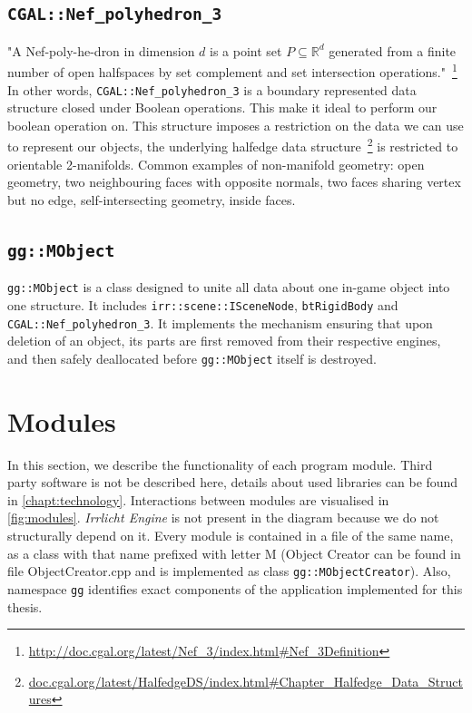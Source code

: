 \subsection*{\tt CGAL::Nef\_polyhedron\_3}
\label{sec:nef}
"A Nef-poly-he-dron in dimension $d$ is a point set $P \subseteq \mathbb{R}^d$ generated from a finite number of open halfspaces by set complement and set intersection operations."~\footnote{\url{http://doc.cgal.org/latest/Nef\_3/index.html\#Nef\_3Definition}} In other words, {\tt CGAL::Nef\_polyhedron\_3} is a boundary represented data structure closed under Boolean operations. This make it ideal to perform our boolean operation on.
This structure imposes a restriction on the data we can use to represent our objects, the underlying halfedge data structure~\footnote{\url{doc.cgal.org/latest/HalfedgeDS/index.html\#Chapter\_Halfedge\_Data\_Structures}} is restricted to orientable 2-manifolds. Common examples of non-manifold geometry: open geometry, two neighbouring faces with opposite normals, two faces sharing vertex but no edge, self-intersecting geometry, inside faces.

\subsection*{\tt gg::MObject} 
{\tt gg::MObject} is a class designed to unite all data about one in-game object into one structure. It includes {\tt irr::scene::ISceneNode}, {\tt btRigidBody} and {\tt CGAL::Nef\_polyhedron\_3}. It implements the mechanism ensuring that upon deletion of an object, its parts are first removed from their respective engines, and then safely deallocated before {\tt gg::MObject} itself is destroyed.


\section{Modules}
In this section, we describe the functionality of each program module. Third party software is not be described here, details about used libraries can be found in \cref{chapt:technology}. Interactions between modules are visualised in \cref{fig:modules}. \emph{Irrlicht Engine} is not present in the diagram because we do not structurally depend on it. Every module is contained in a file of the same name, as a class with that name prefixed with letter M (\ie Object Creator can be found in file ObjectCreator.cpp and is implemented as class {\tt gg::MObjectCreator}). Also, namespace {\tt gg} identifies exact components of the application implemented for this thesis.

